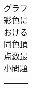 \begin{table}[t]\footnotesize
 \caption{グラフ彩色における同色頂点数最小問題}
 \label{table:min}
 \centering
 \begin{tabular}{|l|c|c|}\hline
  & & \\
 \end{tabular}
\end{table}